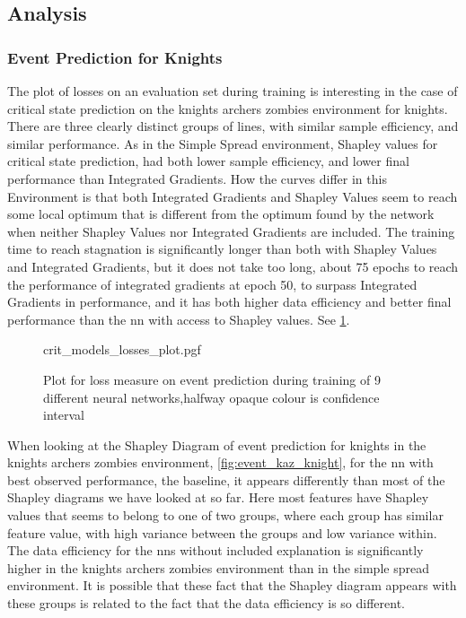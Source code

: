 \documentclass[UKenglish]{uiomasterthesis}
\begin{document}
\subsection{Analysis}
\subsubsection{Event Prediction for Knights}
The plot of losses on an evaluation set during training is interesting in the case of critical state prediction on the knights archers zombies environment for knights. There are three clearly distinct groups of lines, with similar sample efficiency, and similar performance. As in the Simple Spread environment, Shapley values for critical state prediction, had both lower sample efficiency, and lower final performance than Integrated Gradients. How the curves differ in this Environment is that both Integrated Gradients and Shapley Values seem to reach some local optimum that is different from the optimum found by the network when neither Shapley Values nor Integrated Gradients are included. The training time to reach stagnation is significantly longer than both with Shapley Values and Integrated Gradients, but it does not take too long, about 75 epochs to reach the performance of integrated gradients at epoch 50, to surpass Integrated Gradients in performance, and it has both higher data efficiency and better final performance than the \ac{nn} with access to Shapley values. See \cref{fig:event_knight_losses}.

\begin{figure}[H]
\centering
{crit_models_losses_plot.pgf}
\caption{Plot for loss measure on event prediction during training of 9 different neural networks,halfway opaque colour is confidence interval}
\label{fig:event_knight_losses}
\end{figure}

When looking at the Shapley Diagram of event prediction for knights in the knights archers zombies environment, \cref{fig:event_kaz_knight}, for the \ac{nn} with best observed performance, the baseline, it appears differently than most of the Shapley diagrams we have looked at so far. Here most features have Shapley values that seems to belong to one of two groups, where each group has similar feature value, with high variance between the groups and low variance within. The data efficiency for the \acp{nn} without included explanation is significantly higher in the knights archers zombies environment than in the simple spread environment. It is possible that these fact that the Shapley diagram appears with these groups is related to the fact that the data efficiency is so different.
\end{document}
